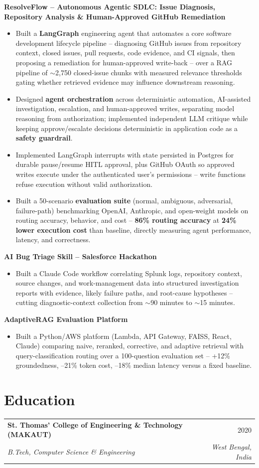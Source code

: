 \documentclass[10.5pt,letterpaper]{article}
\makeatletter
\newcommand{\resumeItem}[1]{\item\small{#1}}
\newcommand{\resumeSubheading}[4]{
  \vspace{4pt}\noindent
  \begin{tabular*}{\textwidth}{l@{\extracolsep{\fill}}r}
    \textbf{#1} & #2 \\
    \textit{\small #3} & \textit{\small #4} \\
  \end{tabular*}\vspace{-2pt}
}
\newcommand{\resumeProject}[2]{
  \vspace{4pt}\noindent
  \textbf{#1} \hfill \textit{\small #2}\vspace{1pt}
}
\makeatother
\begin{document}
\resumeProject{ResolveFlow -- Autonomous Agentic SDLC: Issue Diagnosis, Repository Analysis \& Human-Approved GitHub Remediation}{}
\begin{itemize}
    \resumeItem{Built a \textbf{LangGraph} engineering agent that automates a core software development lifecycle pipeline -- diagnosing GitHub issues from repository context, closed issues, pull requests, code evidence, and CI signals, then proposing a remediation for human-approved write-back -- over a RAG pipeline of $\sim$2,750 closed-issue chunks with measured relevance thresholds gating whether retrieved evidence may influence downstream reasoning.}
    \resumeItem{Designed \textbf{agent orchestration} across deterministic automation, AI-assisted investigation, escalation, and human-approved writes, separating model reasoning from authorization; implemented independent LLM critique while keeping approve/escalate decisions deterministic in application code as a \textbf{safety guardrail}.}
    \resumeItem{Implemented LangGraph interrupts with state persisted in Postgres for durable pause/resume HITL approval, plus GitHub OAuth so approved writes execute under the authenticated user's permissions -- write functions refuse execution without valid authorization.}
    \resumeItem{Built a 50-scenario \textbf{evaluation suite} (normal, ambiguous, adversarial, failure-path) benchmarking OpenAI, Anthropic, and open-weight models on routing accuracy, behavior, and cost -- \textbf{86\% routing accuracy} at \textbf{24\% lower execution cost} than baseline, directly measuring agent performance, latency, and correctness.}
\end{itemize}

\resumeProject{AI Bug Triage Skill -- Salesforce Hackathon}{}
\begin{itemize}
    \resumeItem{Built a Claude Code workflow correlating Splunk logs, repository context, source changes, and work-management data into structured investigation reports with evidence, likely failure paths, and root-cause hypotheses -- cutting diagnostic-context collection from $\sim$90 minutes to $\sim$15 minutes.}
\end{itemize}

\resumeProject{AdaptiveRAG Evaluation Platform}{}
\begin{itemize}
    \resumeItem{Built a Python/AWS platform (Lambda, API Gateway, FAISS, React, Claude) comparing naive, reranked, corrective, and adaptive retrieval with query-classification routing over a 100-question evaluation set -- +12\% groundedness, --21\% token cost, --18\% median latency versus a fixed baseline.}
\end{itemize}

\section*{Education}
\resumeSubheading{St. Thomas' College of Engineering \& Technology (MAKAUT)}{2020}{B.Tech, Computer Science \& Engineering}{West Bengal, India}
\end{document}
